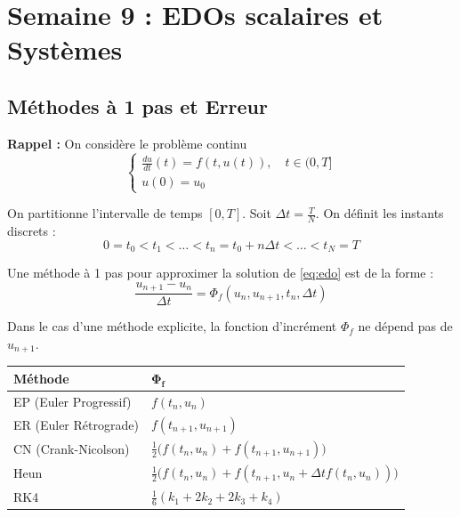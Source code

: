 \section{Semaine 9 : EDOs scalaires et Systèmes}

\subsection{Méthodes à 1 pas et Erreur}

\textbf{Rappel :} On considère le problème continu
\begin{equation}
\begin{cases}
    \frac{du}{dt}(t) = f(t, u(t)), \quad t \in (0, T] \\
    u(0) = u_0
\end{cases} \label{eq:edo}
\end{equation}

On partitionne l'intervalle de temps $[0, T]$. Soit $\Delta t = \frac{T}{N}$. On définit les instants discrets :
$$0 = t_0 < t_1 < \dots < t_n = t_0 + n\Delta t < \dots < t_N = T$$

\begin{definition}
Une méthode à 1 pas pour approximer la solution de \eqref{eq:edo} est de la forme :
\begin{equation}
\frac{u_{n+1} - u_n}{\Delta t} = \Phi_f(u_n, u_{n+1}, t_n, \Delta t)
\end{equation}
\end{definition}

\begin{explication}
Dans le cas d'une méthode explicite, la fonction d'incrément $\Phi_f$ ne dépend pas de $u_{n+1}$.
\end{explication}

\begin{algorithme}
    \centering
    \renewcommand{\arraystretch}{1.2}
    \begin{tabular}{ll}
        \toprule
        \textbf{Méthode} & $\mathbf{\Phi_f}$ \\
        \midrule
        EP (Euler Progressif) & $f(t_n, u_n)$ \\
        ER (Euler Rétrograde) & $f(t_{n+1}, u_{n+1})$ \\
        CN (Crank-Nicolson) & $\frac{1}{2}\big(f(t_n, u_n) + f(t_{n+1}, u_{n+1})\big)$ \\
        Heun & $\frac{1}{2}\big(f(t_n, u_n) + f(t_{n+1}, u_n + \Delta t f(t_n, u_n))\big)$ \\
        RK4 & $\frac{1}{6}(k_1 + 2k_2 + 2k_3 + k_4)$ \\
        \bottomrule
    \end{tabular}
\end{algorithme}

